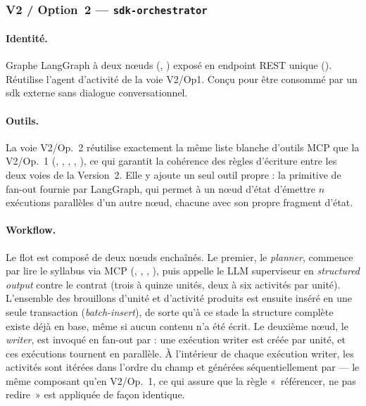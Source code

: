 \subsubsection{V2 / Option~2 — \texttt{sdk-orchestrator}}
\label{sec:v2-op2}

\paragraph{Identité.} Graphe LangGraph à deux nœuds
(, ) exposé en endpoint REST unique
(). Réutilise l'agent
d'activité de la voie V2/Op1. Conçu pour être consommé par un
\gls{sdk} externe sans dialogue conversationnel.

\paragraph{Outils.} La voie V2/Op.~2 réutilise exactement la même
liste blanche d'outils MCP que la V2/Op.~1 (,
, ,
, ),
ce qui garantit la cohérence des règles d'écriture entre les deux
voies de la Version~2. Elle y ajoute un seul outil propre :
la primitive de fan-out  fournie par LangGraph, qui
permet à un nœud d'état d'émettre $n$ exécutions parallèles d'un
autre nœud, chacune avec son propre fragment d'état.

\paragraph{Workflow.}
Le flot est composé de deux nœuds enchaînés. Le premier, le
\emph{planner}, commence par lire le syllabus via MCP
(, , ,
), puis appelle le \textsc{LLM} superviseur en
\emph{structured output} contre le contrat
 (trois à quinze unités, deux à six
activités par unité). L'ensemble des brouillons d'unité et
d'activité produits est ensuite inséré en une seule transaction
(\emph{batch-insert}), de sorte qu'à ce stade la structure complète
existe déjà en base, même si aucun contenu n'a été écrit. Le
deuxième nœud, le \emph{writer}, est invoqué en fan-out par
 :
une exécution writer est créée par unité, et ces exécutions tournent
en parallèle. À l'intérieur de chaque exécution writer, les
activités sont itérées dans l'ordre du champ 
et générées séquentiellement par
 — le même composant
qu'en V2/Op.~1, ce qui assure que la règle «~référencer, ne pas
redire~» est appliquée de façon identique.

